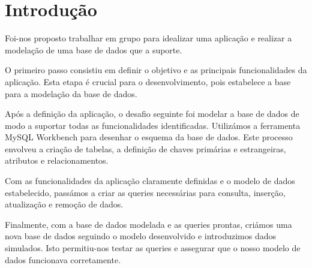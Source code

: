 \section{Introdução} \label{section: Introducao}
Foi-nos proposto trabalhar em grupo para idealizar uma aplicação e realizar a modelação de uma base de dados que a suporte.
\par \vspace{6pt}
O primeiro passo consistiu em definir o objetivo e as principais funcionalidades da aplicação. Esta etapa é crucial para o desenvolvimento, pois estabelece a base para a modelação da base de dados.
\par \vspace{6pt}
Após a definição da aplicação, o desafio seguinte foi modelar a base de dados de modo a suportar todas as funcionalidades identificadas. Utilizámos a ferramenta MySQL Workbench para desenhar o esquema da base de dados. Este processo envolveu a criação de tabelas, a definição de chaves primárias e estrangeiras, atributos e relacionamentos.
\par \vspace{6pt}
Com as funcionalidades da aplicação claramente definidas e o modelo de dados estabelecido, passámos a criar as queries necessárias para consulta, inserção, atualização e remoção de dados.
\par \vspace{6pt}
Finalmente, com a base de dados modelada e as queries prontas, criámos uma nova base de dados seguindo o modelo desenvolvido e introduzimos dados simulados. Isto permitiu-nos testar as queries e assegurar que o nosso modelo de dados funcionava corretamente.

\vspace{10pt}
